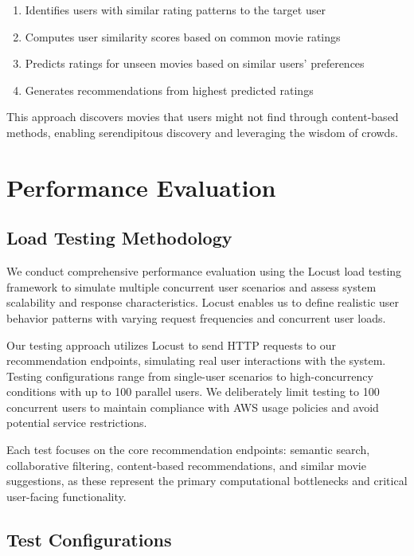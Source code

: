 \documentclass[conference]{IEEEtran}
\begin{document}
\begin{enumerate}
\item Identifies users with similar rating patterns to the target user
\item Computes user similarity scores based on common movie ratings
\item Predicts ratings for unseen movies based on similar users' preferences
\item Generates recommendations from highest predicted ratings
\end{enumerate}

This approach discovers movies that users might not find through content-based methods, enabling serendipitous discovery and leveraging the wisdom of crowds.

\section{Performance Evaluation}

\subsection{Load Testing Methodology}

We conduct comprehensive performance evaluation using the Locust load testing framework to simulate multiple concurrent user scenarios and assess system scalability and response characteristics. Locust enables us to define realistic user behavior patterns with varying request frequencies and concurrent user loads.

Our testing approach utilizes Locust to send HTTP requests to our recommendation endpoints, simulating real user interactions with the system. Testing configurations range from single-user scenarios to high-concurrency conditions with up to 100 parallel users. We deliberately limit testing to 100 concurrent users to maintain compliance with AWS usage policies and avoid potential service restrictions.

Each test focuses on the core recommendation endpoints: semantic search, collaborative filtering, content-based recommendations, and similar movie suggestions, as these represent the primary computational bottlenecks and critical user-facing functionality.

\subsection{Test Configurations}
\end{document}
